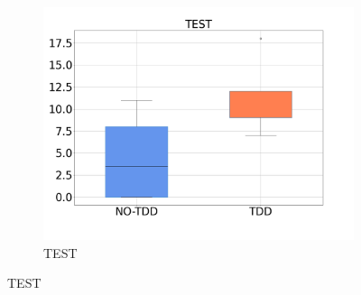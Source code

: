 \begin{figure}[H]
\begin{subfigure}{0.33\textwidth}
        \includegraphics[width=\linewidth]{figures/box_plots/task3/TEST.png}
        \caption{TEST}
        \label{bp_task3_test}
    \end{subfigure}


\end{figure}
